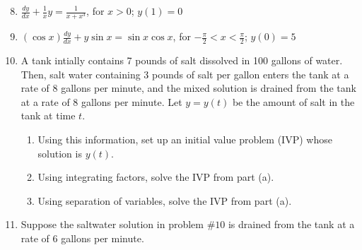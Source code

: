 \documentclass[12pt]{article}
\newif\ifans
\begin{document}
\begin{enumerate}
\setcounter{enumi}{7}

\item $\frac{dy}{dx}+\frac{1}{x}y=\frac{1}{x+x^3}$, for $x>0$; $y(1)=0$

\ifans{\fbox{$y=\frac{\arctan{x}}{x}-\frac{\pi}{4x}$}} \fi

\item $(\cos{x})\frac{dy}{dx}+y\sin{x}=\sin{x}\cos{x}$, for $-\frac{\pi}{2}<x<\frac{\pi}{2}$; $y(0)=5$

\ifans{\fbox{$y=(\cos{x})\ln{(\sec{x})}+5\cos{x}$; Detailed Solution: \textcolor{blue}{\href{http://www.math.drexel.edu/classes/Calculus/resources/Math123HW/Solutions/123_03_Integrating_Factors_09.pdf}{Here}}}} \fi

\item A tank intially contains 7 pounds of salt dissolved in 100 gallons of water.  Then, salt water containing 3 pounds of salt per gallon enters the tank at a rate of 8 gallons per minute, and the mixed solution is drained from the tank at a rate of 8 gallons per minute.  Let $y=y(t)$ be the amount of salt in the tank at time $t$.

\begin{enumerate}

\item Using this information, set up an initial value problem (IVP) whose solution is $y(t)$.

\ifans{\fbox{$\left\{\begin{array}{l}
\frac{dy}{dt}=24-\frac{2y}{25}\\
\\
y(0)=7
\end{array}\right.$}} \fi

\item Using integrating factors, solve the IVP from part (a).

\ifans{\fbox{$y(t)=300-293e^{-2t/25}$}} \fi

\item Using separation of variables, solve the IVP from part (a).

\ifans{\fbox{$y(t)=300-293e^{-2t/25}$}} \fi

\end{enumerate}

\item Suppose the saltwater solution in problem $\#10$ is drained from the tank at a rate of 6 gallons per minute.

\begin{enumerate}


\end{enumerate}
\end{enumerate}
\end{document}
